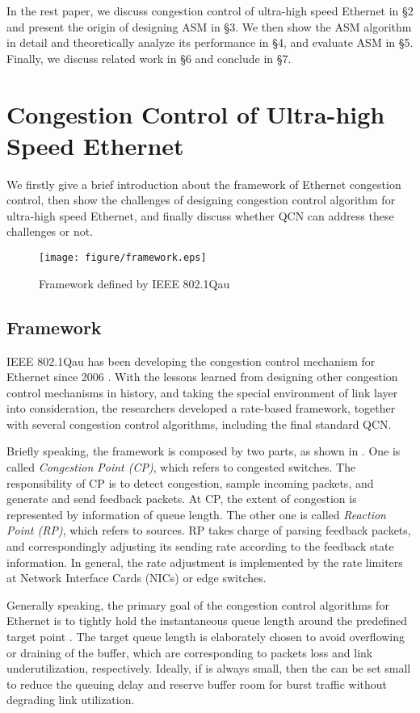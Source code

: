 \documentclass{sig-alternate-10pt}
\begin{document}
In the rest paper, we discuss congestion control of ultra-high speed Ethernet in \S2 and present the origin of designing ASM in \S3. We then show the ASM algorithm in detail and theoretically analyze its performance in \S4, and evaluate ASM in \S5. Finally, we discuss related work in \S6 and conclude in \S7.




\section{Congestion Control of Ultra-high Speed Ethernet}
We firstly give a brief introduction about the framework of Ethernet congestion control, then show the challenges of designing congestion control algorithm for ultra-high speed Ethernet, and finally discuss whether QCN can address these challenges or not.


\begin{figure}
\centering
\texttt{[image: figure/framework.eps]}
\caption{Framework defined by IEEE 802.1Qau}
\label{structure}
\end{figure}

\subsection{Framework}
IEEE 802.1Qau has been developing the congestion control mechanism for Ethernet since 2006 . With the lessons learned from designing other congestion control mechanisms in history, and taking the special environment of link layer into consideration, the researchers developed a rate-based framework, together with several congestion control algorithms, including the final standard QCN. 

Briefly speaking, the framework is composed by two parts, as shown in . One is called \textit{Congestion Point (CP)}, which refers to congested switches. The responsibility of CP is to detect congestion, sample incoming packets, and generate and send feedback packets. At CP, the extent of congestion is represented by information of queue length.  The other one is called \textit{Reaction Point (RP)}, which refers to sources. RP takes charge of parsing feedback packets, and correspondingly adjusting its sending rate according to the feedback state information. In general, the rate adjustment is implemented by the rate limiters at Network Interface Cards (NICs) or edge switches.

Generally speaking, the primary goal of the congestion control algorithms for Ethernet is to tightly hold the instantaneous queue length  around the predefined target point . The target queue length  is elaborately chosen to avoid overflowing or draining of the buffer, which are corresponding to packets loss and link underutilization, respectively. Ideally, if  is always small, then the  can be set small to reduce the queuing delay and reserve buffer room for burst traffic without degrading link utilization.
\end{document}
